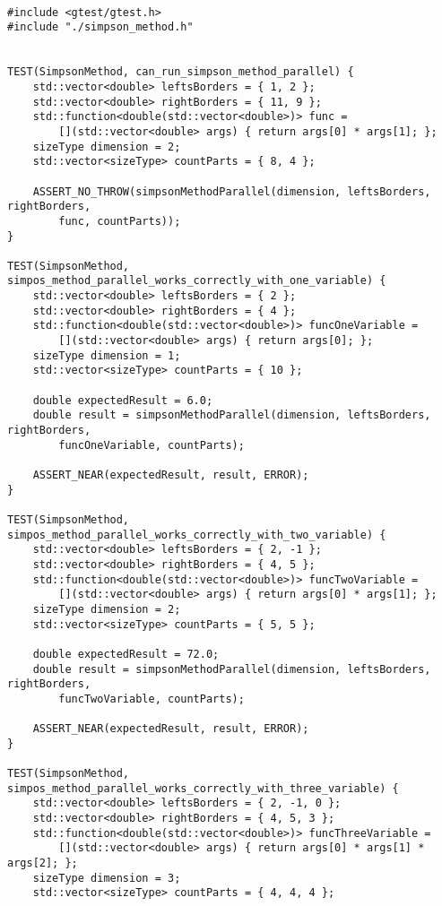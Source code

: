 \documentclass{report}
\begin{document}
\begin{lstlisting}

#include <gtest/gtest.h>
#include "./simpson_method.h"


TEST(SimpsonMethod, can_run_simpson_method_parallel) {
    std::vector<double> leftsBorders = { 1, 2 };
    std::vector<double> rightBorders = { 11, 9 };
    std::function<double(std::vector<double>)> func =
        [](std::vector<double> args) { return args[0] * args[1]; };
    sizeType dimension = 2;
    std::vector<sizeType> countParts = { 8, 4 };

    ASSERT_NO_THROW(simpsonMethodParallel(dimension, leftsBorders, rightBorders,
        func, countParts));
}

TEST(SimpsonMethod, simpos_method_parallel_works_correctly_with_one_variable) {
    std::vector<double> leftsBorders = { 2 };
    std::vector<double> rightBorders = { 4 };
    std::function<double(std::vector<double>)> funcOneVariable =
        [](std::vector<double> args) { return args[0]; };
    sizeType dimension = 1;
    std::vector<sizeType> countParts = { 10 };

    double expectedResult = 6.0;
    double result = simpsonMethodParallel(dimension, leftsBorders, rightBorders,
        funcOneVariable, countParts);

    ASSERT_NEAR(expectedResult, result, ERROR);
}

TEST(SimpsonMethod, simpos_method_parallel_works_correctly_with_two_variable) {
    std::vector<double> leftsBorders = { 2, -1 };
    std::vector<double> rightBorders = { 4, 5 };
    std::function<double(std::vector<double>)> funcTwoVariable =
        [](std::vector<double> args) { return args[0] * args[1]; };
    sizeType dimension = 2;
    std::vector<sizeType> countParts = { 5, 5 };

    double expectedResult = 72.0;
    double result = simpsonMethodParallel(dimension, leftsBorders, rightBorders,
        funcTwoVariable, countParts);

    ASSERT_NEAR(expectedResult, result, ERROR);
}

TEST(SimpsonMethod, simpos_method_parallel_works_correctly_with_three_variable) {
    std::vector<double> leftsBorders = { 2, -1, 0 };
    std::vector<double> rightBorders = { 4, 5, 3 };
    std::function<double(std::vector<double>)> funcThreeVariable =
        [](std::vector<double> args) { return args[0] * args[1] * args[2]; };
    sizeType dimension = 3;
    std::vector<sizeType> countParts = { 4, 4, 4 };


\end{lstlisting}
\end{document}

